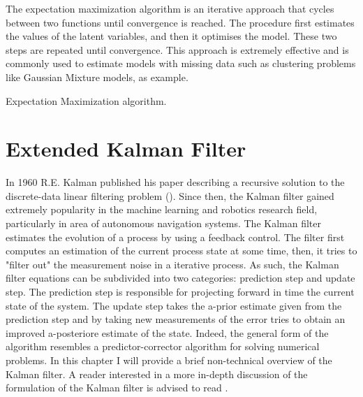 \documentclass[mscthesis]{usiinfthesis}
\begin{document}
The expectation maximization algorithm \cite{paper:EM} is an iterative approach that cycles between two functions until convergence is reached. The procedure first estimates the values of the latent variables, and then it optimises the model. These two steps are repeated until convergence. This approach is extremely effective and is commonly used to estimate models with missing data such as clustering problems like Gaussian Mixture models, as example. \\

\begin{algorithm}
  \caption{Expectation Maximization algorithm.}
\end{algorithm}



\section{Extended Kalman Filter}

In 1960 R.E. Kalman published his paper describing a recursive solution to the discrete-data linear filtering problem (\citet{paper:kalmanfilter}). Since then, the Kalman filter gained extremely popularity in the machine learning and robotics research field, particularly in area of autonomous navigation systems. The Kalman filter estimates the evolution of a process by using a feedback control. The filter first computes an estimation of the current process state at some time, then, it tries to "filter out" the measurement  noise in a iterative process. As such, the Kalman filter equations can be subdivided into two categories: prediction step and update step. The prediction step is responsible for projecting forward in time the current state of the system. The update step takes the a-prior estimate given from the prediction step and by taking new measurements of the error tries to obtain an improved a-posteriore estimate of the state. Indeed, the general form of the algorithm resembles a predictor-corrector algorithm for solving numerical problems. In this chapter I will provide a brief non-technical overview of the Kalman filter. A reader interested in a more in-depth discussion of the formulation of the Kalman filter is advised to read \citet{paper:Maybeck79}.

\end{document}
